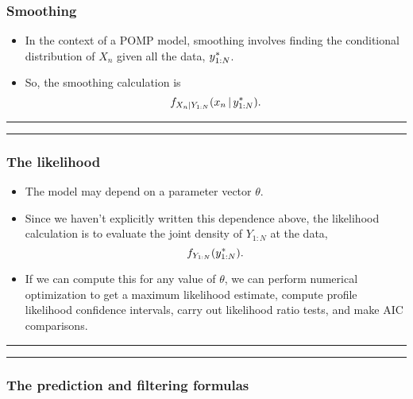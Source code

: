 \documentclass[]{article}
\begin{document}
\subsubsection{Smoothing}\label{smoothing}

\begin{itemize}
\item
  In the context of a POMP model, smoothing involves finding the
  conditional distribution of \(X_n\) given all the data,
  \(y_{1:N}^*\).
\item
  So, the smoothing calculation is
  \[f_{X_{n}|Y_{1:N}}(x_n{\, | \,} y_{1:N}^*).\]
\end{itemize}

\begin{center}\rule{0.5\linewidth}{\linethickness}\end{center}

\begin{center}\rule{0.5\linewidth}{\linethickness}\end{center}

\subsubsection{The likelihood}\label{the-likelihood}

\begin{itemize}
\item
  The model may depend on a parameter vector \(\theta\).
\item
  Since we haven't explicitly written this dependence above, the
  likelihood calculation is to evaluate the joint density of \(Y_{1:N}\)
  at the data, \[f_{Y_{1:N}}(y_{1:N}^*).\]
\item
  If we can compute this for any value of \(\theta\), we can perform
  numerical optimization to get a maximum likelihood estimate, compute
  profile likelihood confidence intervals, carry out likelihood ratio
  tests, and make AIC comparisons.
\end{itemize}

\begin{center}\rule{0.5\linewidth}{\linethickness}\end{center}

\begin{center}\rule{0.5\linewidth}{\linethickness}\end{center}

\subsubsection{The prediction and filtering
formulas}\label{the-prediction-and-filtering-formulas}
\end{document}

